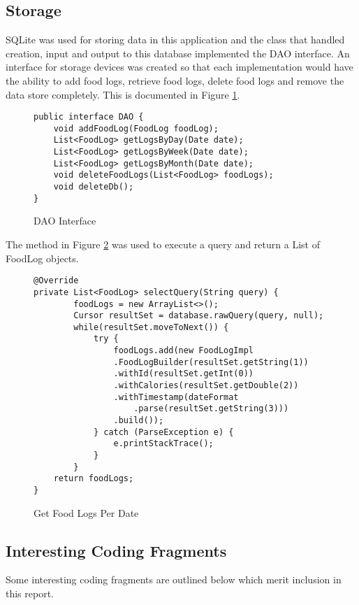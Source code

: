 \tocless\subsection{Storage}
SQLite was used for storing data in this application and the class that handled creation, input and output to this database implemented the DAO interface.
An interface for storage devices was created so that each implementation would have the ability to add food logs, retrieve food logs, delete food logs and remove the data store completely.
This is documented in Figure \ref{lst:daoInterface}.
\begin{figure}[h]
\caption{DAO Interface}
\label{lst:daoInterface}
\begin{lstlisting}[style=Java]
public interface DAO {
    void addFoodLog(FoodLog foodLog);
    List<FoodLog> getLogsByDay(Date date);
    List<FoodLog> getLogsByWeek(Date date);
    List<FoodLog> getLogsByMonth(Date date);
    void deleteFoodLogs(List<FoodLog> foodLogs);
    void deleteDb();
}
\end{lstlisting}
\end{figure}

The method in Figure \ref{lst:getLogs} was used to execute a query and return a List of FoodLog objects.
\begin{figure}[h]
\caption{Get Food Logs Per Date}
\label{lst:getLogs}
\begin{lstlisting}[style=Java]
@Override
private List<FoodLog> selectQuery(String query) {
        foodLogs = new ArrayList<>();
        Cursor resultSet = database.rawQuery(query, null);
        while(resultSet.moveToNext()) {
            try {
                foodLogs.add(new FoodLogImpl
                .FoodLogBuilder(resultSet.getString(1))
                .withId(resultSet.getInt(0))
                .withCalories(resultSet.getDouble(2))
                .withTimestamp(dateFormat
                    .parse(resultSet.getString(3)))
                .build());
            } catch (ParseException e) {
                e.printStackTrace();
            }
        }
    return foodLogs;
}
\end{lstlisting}
\end{figure}

\tocless\subsection{Interesting Coding Fragments}
Some interesting coding fragments are outlined below which merit inclusion in this report.

